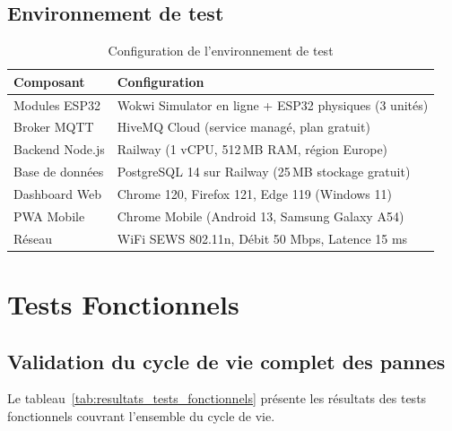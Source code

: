 \subsection{Environnement de test}

\begin{table}[htbp]
\centering
\caption{Configuration de l'environnement de test}
\label{tab:environnement_test}
\small
\begin{tabular}{@{}p{3.5cm}p{8.5cm}@{}}
\toprule
\textbf{Composant} & \textbf{Configuration} \\
\midrule
\rowcolor{gray!10}
Modules ESP32 & Wokwi Simulator en ligne + ESP32 physiques (3 unités) \\
Broker MQTT & HiveMQ Cloud (service managé, plan gratuit) \\
\rowcolor{gray!10}
Backend Node.js & Railway (1 vCPU, 512\,MB RAM, région Europe) \\
Base de données & PostgreSQL 14 sur Railway (25\,MB stockage gratuit) \\
\rowcolor{gray!10}
Dashboard Web & Chrome 120, Firefox 121, Edge 119 (Windows 11) \\
PWA Mobile & Chrome Mobile (Android 13, Samsung Galaxy A54) \\
\rowcolor{gray!10}
Réseau & WiFi SEWS 802.11n, Débit 50 Mbps, Latence 15 ms \\
\bottomrule
\end{tabular}
\end{table}


\section{Tests Fonctionnels}

\subsection{Validation du cycle de vie complet des pannes}

Le tableau~\ref{tab:resultats_tests_fonctionnels} présente les résultats des tests fonctionnels couvrant l'ensemble du cycle de vie.

